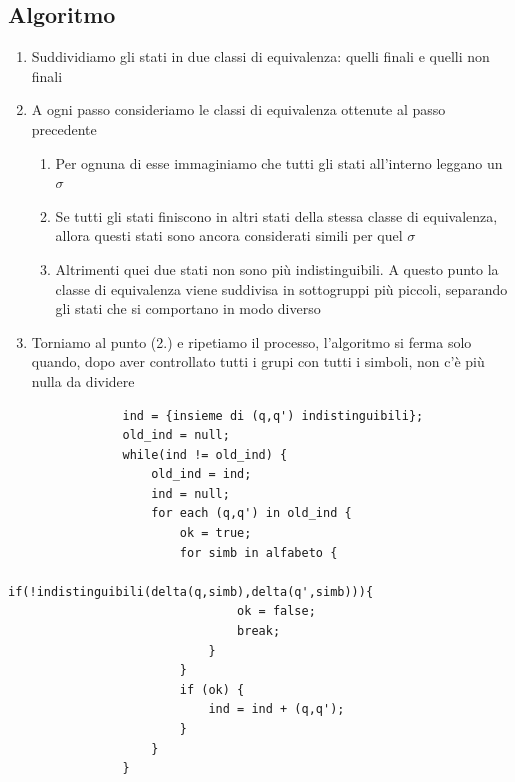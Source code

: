 \documentclass[12pt, a4paper]{report}
\begin{document}
            \subsection{Algoritmo}
                \begin{enumerate}
                    \item Suddividiamo gli stati in due classi di equivalenza: quelli finali e quelli non finali
                    \item A ogni passo consideriamo le classi di equivalenza ottenute al passo precedente \begin{enumerate}
                        \item  Per ognuna di esse immaginiamo che tutti gli stati all'interno leggano un $\sigma$
                        \item Se tutti gli stati finiscono in altri stati della stessa classe di equivalenza, allora questi stati sono ancora considerati simili per quel $\sigma$
                        \item Altrimenti quei due stati non sono più indistinguibili. A questo punto la classe di equivalenza viene suddivisa in sottogruppi più piccoli, separando gli stati che si comportano in modo diverso
                    \end{enumerate}
                    \item Torniamo al punto (2.) e ripetiamo il processo, l'algoritmo si ferma solo quando, dopo aver controllato tutti i grupi con tutti i simboli, non c'è più nulla da dividere 
                \end{enumerate}
                \begin{lstlisting}
                ind = {insieme di (q,q') indistinguibili};
                old_ind = null;
                while(ind != old_ind) {
                    old_ind = ind;
                    ind = null;
                    for each (q,q') in old_ind {
                        ok = true;
                        for simb in alfabeto {
                            if(!indistinguibili(delta(q,simb),delta(q',simb))){
                                ok = false;
                                break;
                            }
                        }
                        if (ok) {
                            ind = ind + (q,q');
                        }
                    }
                }
                \end{lstlisting}
\end{document}
